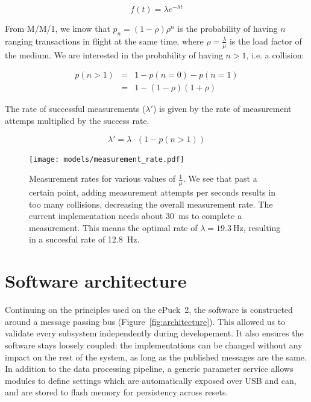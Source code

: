 \documentclass[a4paper, 12pt]{scrreprt}
\begin{document}
\begin{equation}
f(t) = \lambda e^{-\lambda t}
\end{equation}

From M/M/1, we know that $p_n = (1 - \rho) \rho^n$ is the probability of having $n$ ranging transactions in flight at the same time, where $\rho = \frac{\lambda}{\mu}$ is the load factor of the medium.
We are interested in the probability of having $n > 1$, i.e. a collision:

\begin{eqnarray}
    p(n>1) &=& 1 - p(n=0) - p(n=1) \\
       &=& 1 - (1 - \rho) (1 + \rho)
\end{eqnarray}

The rate of successful measurements ($\lambda'$) is given by the rate of measurement attemps multiplied by the success rate.

\begin{equation}
\lambda' = \lambda \cdot (1 - p(n>1))
\end{equation}


\begin{figure}[h]
    \centering
    \texttt{[image: models/measurement\_rate.pdf]}
    \caption{
        Measurement rates for various values of $\frac{1}{\mu}$.
        We see that past a certain point, adding measurement attempts per seconds results in too many collisions, decreasing the overall measurement rate.
        The current implementation needs about \SI{30}{\milli\second} to complete a measurement.
        This means the optimal rate of $\lambda = \SI{19.3}{\hertz}$, resulting in a succesful rate of \SI{12.8}{\hertz}.\label{fig:measurement-rate}
    }
\end{figure}


\section{Software architecture}

Continuing on the principles used on the ePuck~2, the software is constructed around a message passing bus (Figure~\ref{fig:architecture}).
This allowed us to validate every subsystem independently during developement.
It also ensures the software stays loosely coupled: the implementations can be changed without any impact on the rest of the system, as long as the published messages are the same.
In addition to the data processing pipeline, a generic parameter service allows modules to define settings which are automatically exposed over USB and \gls{can}, and are stored to flash memory for persistency across resets.
\end{document}
